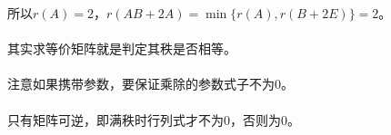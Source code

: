 所以$r(A)=2$，$r(AB+2A)=\min\{r(A),r(B+2E)\}=2$。

\paragraph{}

其实求等价矩阵就是判定其秩是否相等。

\paragraph{}

注意如果携带参数，要保证乘除的参数式子不为0。

\paragraph{}

只有矩阵可逆，即满秩时行列式才不为0，否则为0。

